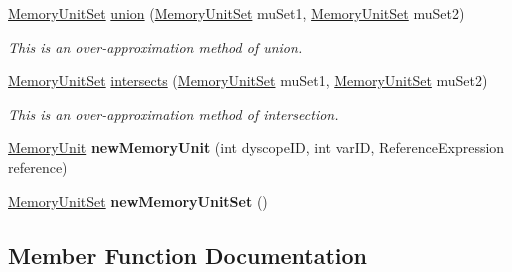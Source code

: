 \begin{DoxyCompactItemize}
\hyperlink{interfaceedu_1_1udel_1_1cis_1_1vsl_1_1civl_1_1state_1_1IF_1_1MemoryUnitSet}{Memory\+Unit\+Set} \hyperlink{interfaceedu_1_1udel_1_1cis_1_1vsl_1_1civl_1_1state_1_1IF_1_1MemoryUnitFactory_a8142f2c1e6ef3c9bfbe12355ffe3f133}{union} (\hyperlink{interfaceedu_1_1udel_1_1cis_1_1vsl_1_1civl_1_1state_1_1IF_1_1MemoryUnitSet}{Memory\+Unit\+Set} mu\+Set1, \hyperlink{interfaceedu_1_1udel_1_1cis_1_1vsl_1_1civl_1_1state_1_1IF_1_1MemoryUnitSet}{Memory\+Unit\+Set} mu\+Set2)
\begin{DoxyCompactList}\small\item\em This is an over-\/approximation method of union. \end{DoxyCompactList}\item 
\hyperlink{interfaceedu_1_1udel_1_1cis_1_1vsl_1_1civl_1_1state_1_1IF_1_1MemoryUnitSet}{Memory\+Unit\+Set} \hyperlink{interfaceedu_1_1udel_1_1cis_1_1vsl_1_1civl_1_1state_1_1IF_1_1MemoryUnitFactory_a08f26ce4f2067fd0e1105dd277fa841c}{intersects} (\hyperlink{interfaceedu_1_1udel_1_1cis_1_1vsl_1_1civl_1_1state_1_1IF_1_1MemoryUnitSet}{Memory\+Unit\+Set} mu\+Set1, \hyperlink{interfaceedu_1_1udel_1_1cis_1_1vsl_1_1civl_1_1state_1_1IF_1_1MemoryUnitSet}{Memory\+Unit\+Set} mu\+Set2)
\begin{DoxyCompactList}\small\item\em This is an over-\/approximation method of intersection. \end{DoxyCompactList}\item 
\hypertarget{interfaceedu_1_1udel_1_1cis_1_1vsl_1_1civl_1_1state_1_1IF_1_1MemoryUnitFactory_a93ced3b330a055d9caf6578b5fef408c}{}\hyperlink{interfaceedu_1_1udel_1_1cis_1_1vsl_1_1civl_1_1state_1_1IF_1_1MemoryUnit}{Memory\+Unit} {\bfseries new\+Memory\+Unit} (int dyscope\+I\+D, int var\+I\+D, Reference\+Expression reference)\label{interfaceedu_1_1udel_1_1cis_1_1vsl_1_1civl_1_1state_1_1IF_1_1MemoryUnitFactory_a93ced3b330a055d9caf6578b5fef408c}

\item 
\hypertarget{interfaceedu_1_1udel_1_1cis_1_1vsl_1_1civl_1_1state_1_1IF_1_1MemoryUnitFactory_a99c658a85bf14fbe7d844412597ab003}{}\hyperlink{interfaceedu_1_1udel_1_1cis_1_1vsl_1_1civl_1_1state_1_1IF_1_1MemoryUnitSet}{Memory\+Unit\+Set} {\bfseries new\+Memory\+Unit\+Set} ()\label{interfaceedu_1_1udel_1_1cis_1_1vsl_1_1civl_1_1state_1_1IF_1_1MemoryUnitFactory_a99c658a85bf14fbe7d844412597ab003}

\end{DoxyCompactItemize}


\subsection{Member Function Documentation}
\hypertarget{interfaceedu_1_1udel_1_1cis_1_1vsl_1_1civl_1_1state_1_1IF_1_1MemoryUnitFactory_a45c2d19cbc76ed74d1cb8531c96628a4}{}
